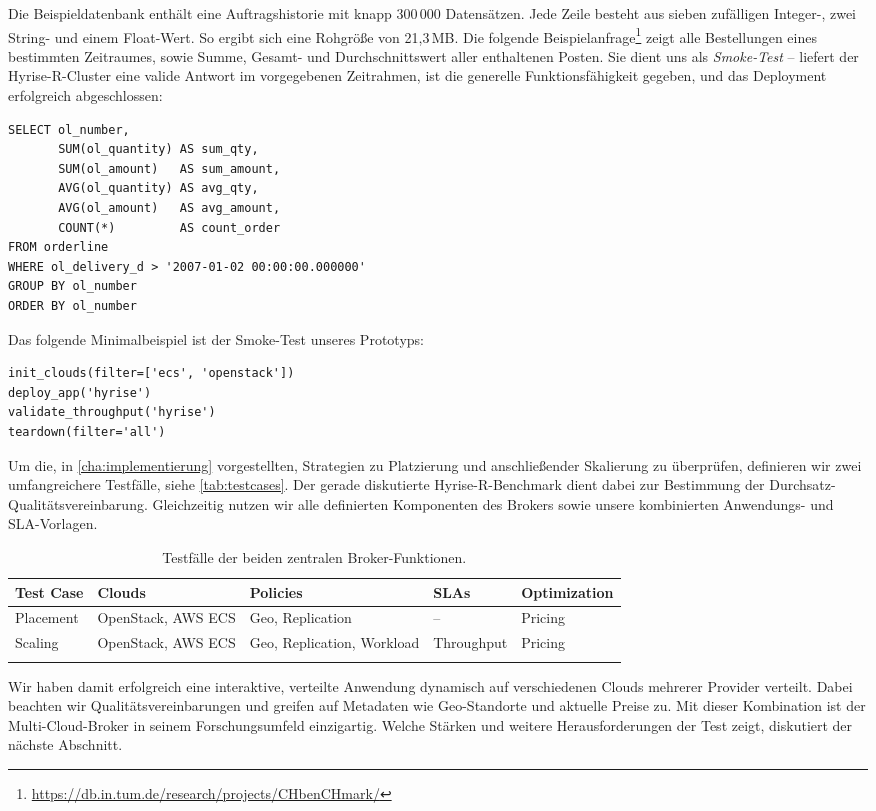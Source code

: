 Die Beispieldatenbank enthält eine Auftragshistorie mit knapp 300\,000 Datensätzen. Jede Zeile besteht aus sieben zufälligen Integer-, zwei String- und einem Float-Wert. So ergibt sich eine Rohgröße von 21,3\,MB. Die folgende Beispielanfrage\footnote{\url{https://db.in.tum.de/research/projects/CHbenCHmark/}} zeigt alle Bestellungen eines bestimmten Zeitraumes, sowie Summe, Gesamt- und Durchschnittswert aller enthaltenen Posten. Sie dient uns als \emph{Smoke-Test} -- liefert der Hyrise-R-Cluster eine valide Antwort im vorgegebenen Zeitrahmen, ist die generelle Funktionsfähigkeit gegeben, und das Deployment erfolgreich abgeschlossen:

\begin{verbatim}
SELECT ol_number,
       SUM(ol_quantity) AS sum_qty,
       SUM(ol_amount)   AS sum_amount,
       AVG(ol_quantity) AS avg_qty,
       AVG(ol_amount)   AS avg_amount,
       COUNT(*)         AS count_order
FROM orderline 
WHERE ol_delivery_d > '2007-01-02 00:00:00.000000' 
GROUP BY ol_number
ORDER BY ol_number
\end{verbatim}


\noindent
Das folgende Minimalbeispiel ist der Smoke-Test unseres Prototyps:
\begin{verbatim}
init_clouds(filter=['ecs', 'openstack'])
deploy_app('hyrise')
validate_throughput('hyrise')
teardown(filter='all')
\end{verbatim}

\noindent
Um die, in \autoref{cha:implementierung} vorgestellten, Strategien zu Platzierung und anschließender Skalierung zu überprüfen, definieren wir zwei umfangreichere Testfälle, siehe \autoref{tab:testcases}. Der gerade diskutierte Hyrise-R-Benchmark dient dabei zur Bestimmung der Durchsatz-Qualitätsvereinbarung. Gleichzeitig nutzen wir alle definierten Komponenten des Brokers sowie unsere kombinierten Anwendungs- und SLA-Vorlagen.

\begin{table}[h!]
\centering%
\caption{Testfälle der beiden zentralen Broker-Funktionen.}
\begin{tabularx}{\textwidth}{LLLLL}%
\toprule%
%
Test Case & Clouds & Policies & SLAs & Optimization\\%
%
\midrule%
%
Placement & OpenStack, AWS ECS & Geo, Replication & -- & Pricing\\%
Scaling   & OpenStack, AWS ECS & Geo, Replication, Workload & Throughput & Pricing\\%
\bottomrule%
\label{tab:testcases}
\end{tabularx}
\end{table}

Wir haben damit erfolgreich eine interaktive, verteilte Anwendung dynamisch auf verschiedenen Clouds mehrerer Provider verteilt. Dabei beachten wir Qualitätsvereinbarungen und greifen auf Metadaten wie Geo-Standorte und aktuelle Preise zu. Mit dieser Kombination ist der Multi-Cloud-Broker in seinem Forschungsumfeld einzigartig. Welche Stärken und weitere Herausforderungen der Test zeigt, diskutiert der nächste Abschnitt.
